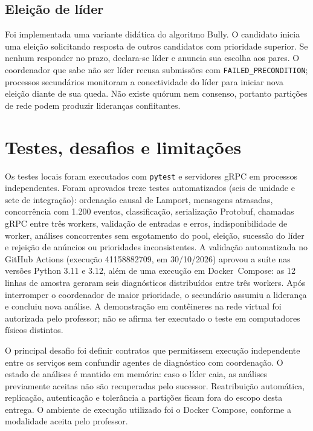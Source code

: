 \documentclass[12pt]{article}
\begin{document}
\subsection{Elei\c{c}\~ao de l\'ider}
Foi implementada uma variante did\'atica do algoritmo Bully. O candidato inicia uma elei\c{c}\~ao solicitando resposta de outros candidatos com prioridade superior. Se nenhum responder no prazo, declara-se l\'ider e anuncia sua escolha aos pares. O coordenador que sabe n\~ao ser l\'ider recusa submiss\~oes com \texttt{FAILED\_PRECONDITION}; processos secund\'arios monitoram a conectividade do l\'ider para iniciar nova elei\c{c}\~ao diante de sua queda. N\~ao existe qu\'orum nem consenso, portanto parti\c{c}\~oes de rede podem produzir lideran\c{c}as conflitantes.

\section{Testes, desafios e limita\c{c}\~oes}
Os testes locais foram executados com \texttt{pytest} e servidores gRPC em processos independentes. Foram aprovados treze testes automatizados (seis de unidade e sete de integra\c{c}\~ao): ordena\c{c}\~ao causal de Lamport, mensagens atrasadas, concorr\^encia com 1.200 eventos, classifica\c{c}\~ao, serializa\c{c}\~ao Protobuf, chamadas gRPC entre tr\^es workers, valida\c{c}\~ao de entradas e erros, indisponibilidade de worker, an\'alises concorrentes sem esgotamento do pool, elei\c{c}\~ao, sucess\~ao do l\'ider e rejei\c{c}\~ao de an\'uncios ou prioridades inconsistentes. A valida\c{c}\~ao automatizada no GitHub Actions (execu\c{c}\~ao 41158882709, em 30/10/2026) aprovou a su\'ite nas vers\~oes Python 3.11 e 3.12, al\'em de uma execu\c{c}\~ao em \mbox{Docker Compose}: as 12 linhas de amostra geraram seis diagn\'osticos distribu\'idos entre tr\^es workers. Ap\'os interromper o coordenador de maior prioridade, o secund\'ario assumiu a lideran\c{c}a e concluiu nova an\'alise. A demonstra\c{c}\~ao em cont\^eineres na rede virtual foi autorizada pelo professor; n\~ao se afirma ter executado o teste em computadores f\'isicos distintos.



O principal desafio foi definir contratos que permitissem execu\c{c}\~ao independente entre os servi\c{c}os sem confundir agentes de diagn\'ostico com coordena\c{c}\~ao. O estado de an\'alises \'e mantido em mem\'oria: caso o l\'ider caia, as an\'alises previamente aceitas n\~ao s\~ao recuperadas pelo sucessor. Reatribui\c{c}\~ao autom\'atica, replica\c{c}\~ao, autentica\c{c}\~ao e toler\^ancia a parti\c{c}\~oes ficam fora do escopo desta entrega. O ambiente de execu\c{c}\~ao utilizado foi o Docker Compose, conforme a modalidade aceita pelo professor.
\end{document}
